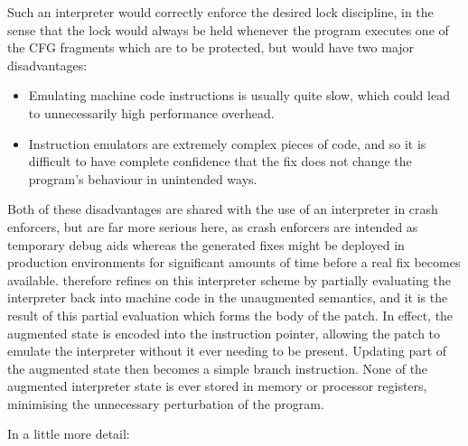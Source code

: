 Such an interpreter would correctly enforce the desired lock
discipline, in the sense that the lock would always be held whenever
the program executes one of the CFG fragments which are to be
protected, but would have two major disadvantages:

\begin{itemize}
\item Emulating machine code instructions is usually quite slow, which
  could lead to unnecessarily high performance overhead.
\item Instruction emulators are extremely complex pieces of code, and
  so it is difficult to have complete confidence that the fix does not
  change the program's behaviour in unintended ways.
\end{itemize}

Both of these disadvantages are shared with the use of an interpreter
in crash enforcers, but are far more serious here, as crash enforcers
are intended as temporary debug aids whereas the generated fixes might
be deployed in production environments for significant amounts of time
before a real fix becomes available.  {\Technique} therefore refines
on this interpreter scheme by partially evaluating the
interpreter\needCite{} back into machine code in the unaugmented
semantics, and it is the result of this partial evaluation which forms
the body of the patch.  In effect, the augmented state is encoded into
the instruction pointer, allowing the patch to emulate the interpreter
without it ever needing to be present.  Updating part of the augmented
state then becomes a simple branch instruction.  None of the augmented
interpreter state is ever stored in memory or processor registers,
minimising the unnecessary perturbation of the program.

In a little more detail:

